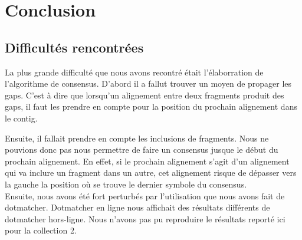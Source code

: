 \documentclass[a4paper, 12pt, titlepage]{article}
\begin{document}
\section{Conclusion}
\subsection{Difficultés rencontrées}
La plus grande difficulté que nous avons recontré était l'élaborration de l'algorithme de consensus.
D'abord il a fallut trouver un moyen de propager les gaps.
C'est à dire que lorsqu'un alignement entre deux fragments produit des gaps, il faut les prendre en compte pour la position du prochain alignement dans le contig.

Ensuite, il fallait prendre en compte les inclusions de fragments.
Nous ne pouvions donc pas nous permettre de faire un consensus jusque le début du prochain alignement.
En effet, si le prochain alignement s'agit d'un alignement qui va inclure un fragment dans un autre, cet alignement risque de dépasser vers la gauche la position où se trouve le dernier symbole du consensus.\\

Ensuite, nous avons été fort perturbés par l'utilisation que nous avons fait de dotmatcher. Dotmatcher en ligne nous affichait des résultats différents de dotmatcher hors-ligne.
Nous n'avons pas pu reproduire le résultats reporté ici pour la collection 2.
\end{document}

